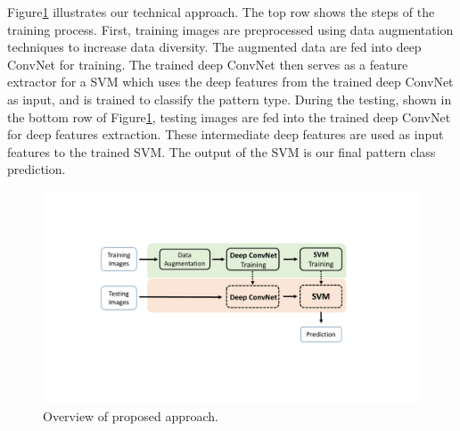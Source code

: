 
Figure\ref{fig.method} illustrates our technical approach.   
%
The top row shows the steps of the training process.  First, training images are preprocessed using data augmentation techniques to increase data diversity. 
The augmented data are fed into deep ConvNet for training. The trained deep ConvNet then serves as a feature extractor for a SVM which uses the deep features from the trained deep ConvNet as input, and is trained to classify the pattern type.
%
During the testing, shown in the bottom row of Figure\ref{fig.method}, testing images are fed into the trained deep ConvNet for deep features extraction. These intermediate deep features are used as input features to the trained SVM. The output of the SVM is our final pattern class prediction.


\begin{figure}[!ht]
	\begin{center}
		\includegraphics[scale=0.38,clip=true,trim = 50mm 55mm 50mm 50mm]{fig/figs/method_overview.pdf}
	\end{center}
	\caption{Overview of proposed approach.} 
	\label{fig.method}
\end{figure}

